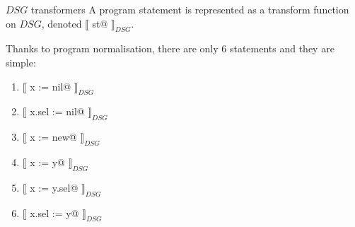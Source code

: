 \documentclass[xcolor={usenames,dvipsnames}]{beamer}
\makeatletter
\newcommand{\transformer}[2]{$\llbracket$ \lstinline@#1@ $\rrbracket_{#2}$}
\newcommand{\transformerDSG}[1]{\transformer{#1}{DSG}}
\makeatother
\begin{document}
\begin{frame}[fragile]{$DSG$ transformers}
  A program statement is represented as a transform function on $DSG$, denoted \transformerDSG{st}.
  
  \vspace{1em}  
  
  Thanks to program normalisation, there are only 6 statements and they are simple:
  
  \begin{enumerate}
  \item \transformerDSG{x := nil}
  \item \transformerDSG{x.sel := nil}
  \item \transformerDSG{x := new}
  \item \transformerDSG{x := y}
  \item \transformerDSG{x := y.sel}
  \item \transformerDSG{x.sel := y}
  \end{enumerate}
\end{frame}
\end{document}
